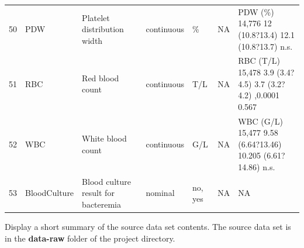 \documentclass[
  letterpaper,
  DIV=11,
  numbers=noendperiod]{scrreport}
\begin{document}
\begin{longtable}{rllllll}
50 & PDW & Platelet distribution width & continuous & \% & NA & PDW (\%) 14,776 12 (10.8?13.4) 12.1 (10.8?13.7) n.s. \\ 
51 & RBC & Red blood count & continuous & T/L & NA & RBC (T/L) 15,478 3.9 (3.4?4.5) 3.7 (3.2?4.2) ,0.0001 0.567 \\ 
52 & WBC & White blood count & continuous & G/L & NA & WBC (G/L) 15,477 9.58 (6.64?13.46) 10.205 (6.61?14.86) n.s. \\ 
53 & BloodCulture & Blood culture result for bacteremia & nominal & no, yes & NA & NA \\ 
\bottomrule
\end{longtable}

Display a short summary of the source data set contents. The source data
set is in the \textbf{data-raw} folder of the project directory.
\end{document}

